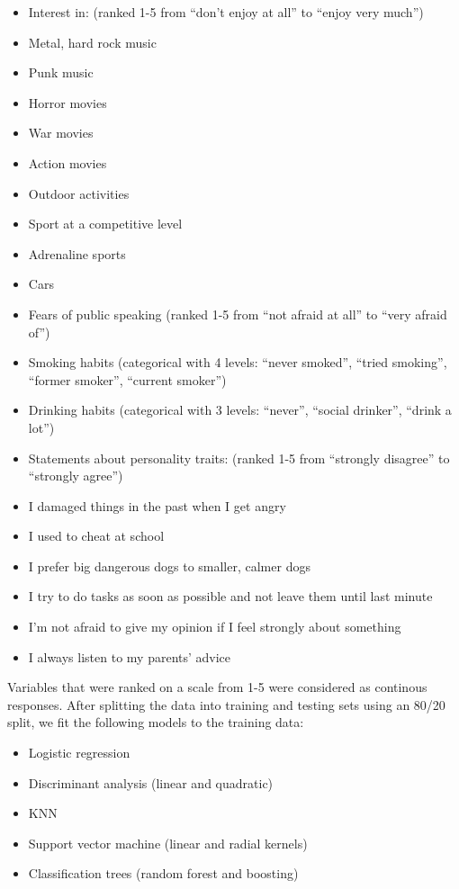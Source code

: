 \documentclass[]{article}
\providecommand{\tightlist}{%
  \setlength{\itemsep}{0pt}\setlength{\parskip}{0pt}}
\begin{document}
\begin{itemize}
\tightlist
\item
  Interest in: (ranked 1-5 from ``don't enjoy at all'' to ``enjoy very
  much'')
\item
  Metal, hard rock music
\item
  Punk music
\item
  Horror movies
\item
  War movies
\item
  Action movies
\item
  Outdoor activities
\item
  Sport at a competitive level
\item
  Adrenaline sports
\item
  Cars
\item
  Fears of public speaking (ranked 1-5 from ``not afraid at all'' to
  ``very afraid of'')
\item
  Smoking habits (categorical with 4 levels: ``never smoked'', ``tried
  smoking'', ``former smoker'', ``current smoker'')
\item
  Drinking habits (categorical with 3 levels: ``never'', ``social
  drinker'', ``drink a lot'')
\item
  Statements about personality traits: (ranked 1-5 from ``strongly
  disagree'' to ``strongly agree'')
\item
  I damaged things in the past when I get angry
\item
  I used to cheat at school
\item
  I prefer big dangerous dogs to smaller, calmer dogs
\item
  I try to do tasks as soon as possible and not leave them until last
  minute
\item
  I'm not afraid to give my opinion if I feel strongly about something
\item
  I always listen to my parents' advice
\end{itemize}

Variables that were ranked on a scale from 1-5 were considered as
continous responses. After splitting the data into training and testing
sets using an 80/20 split, we fit the following models to the training
data:

\begin{itemize}
\tightlist
\item
  Logistic regression
\item
  Discriminant analysis (linear and quadratic)
\item
  KNN
\item
  Support vector machine (linear and radial kernels)
\item
  Classification trees (random forest and boosting)
\end{itemize}
\end{document}
